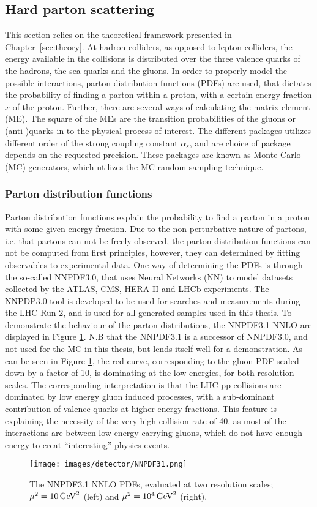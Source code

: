 \subsection{Hard parton scattering}
This section relies on the theoretical framework presented in Chapter~\ref{sec:theory}. 
At hadron colliders, as opposed to lepton colliders, the energy available in the collisions is distributed over the three valence quarks of the hadrons, the sea quarks and the gluons. 
In order to properly model the possible interactions, parton distribution functions (PDFs) are used, that dictates the probability of finding a parton within a proton, with a certain energy fraction $x$ of the proton. 
Further, there are several ways of calculating the matrix element (ME). The square of the MEs are the transition probabilities of the gluons or (anti-)quarks in to the physical process of interest.
The different packages utilizes different order of the strong coupling constant $\alpha_{s}$, and are choice of package depends on the requested precision.
These packages are known as Monte Carlo (MC) generators, which utilizes the MC random sampling technique.  
\subsubsection{Parton distribution functions}
Parton distribution functions explain the probability to find a parton in a proton with some given energy fraction. 
Due to the non-perturbative nature of partons, i.e. that partons can not be freely observed, the parton distribution functions can not be computed from first principles, however, they can determined by fitting observables to experimental data. 
One way of determining the PDFs is through the so-called NNPDF3.0, that uses Neural Networks (NN) to model datasets collected by the ATLAS, CMS, HERA-II and LHCb experiments\cite{Ball:2014uwa}. 
The NNPDP3.0 tool is developed to be used for searches and measurements during the LHC Run 2, and is used for all generated samples used in this thesis. 
To demonstrate the behaviour of the parton distributions, the NNPDF3.1 NNLO are displayed in Figure \ref{fig:NNPDF31}. 
N.B that the NNPDF3.1 is a successor of NNPDF3.0, and not used for the MC in this thesis, but lends itself well for a demonstration. 
As can be seen in Figure \ref{fig:NNPDF31}, the red curve, corresponding to the gluon PDF scaled down by a factor of 10, is dominating at the low energies, for both resolution scales. 
The corresponding interpretation is that the LHC pp collisions are dominated by low energy gluon induced processes, with a sub-dominant contribution of valence quarks at higher energy fractions. 
This feature is explaining the necessity of the very high collision rate of 40\MHz, as most of the interactions are between low-energy carrying gluons, which do not have enough energy to creat ``interesting'' physics events.  
\begin{figure}[!htp]
  \centering
   \texttt{[image: images/detector/NNPDF31.png]}
   \caption{The NNPDF3.1 NNLO PDFs, evaluated at two resolution scales; $\mu^{2}=10\,\text{Ge\hspace{-.08em}V}^{2}$ (left) and  $\mu^{2}=10^{4}\,\text{Ge\hspace{-.08em}V}^{2}$ (right)\cite{Ball:2017nwa}.}
   \label{fig:NNPDF31}
\end{figure}
